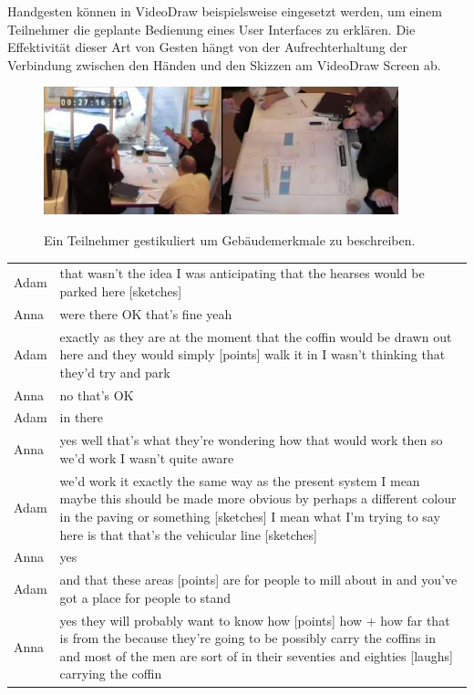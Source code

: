 \medskip Handgesten können in VideoDraw beispielsweise eingesetzt werden, um einem Teilnehmer die geplante Bedienung eines User Interfaces zu erklären. Die Effektivität dieser Art von Gesten hängt von der Aufrechterhaltung der Verbindung zwischen den Händen und den Skizzen am VideoDraw Screen ab.

\medskip
\begin{figure}[bth]
	{\includegraphics[width=\linewidth]{gfx/dantecGestures}}
	\caption[Beispiel von Gestik in einem Designmeeting. \citep{Dantec:2009}]{Ein Teilnehmer gestikuliert um Gebäudemerkmale zu beschreiben.}
	\label{fig:dantecGestures}
\end{figure}

\begin{extract}{
		\myfloatalign
		\begin{tabularx}{\textwidth}{p{1cm}X}
    		Adam & that wasn’t the idea I was anticipating that the hearses would be parked here [sketches] \\
			Anna & were there OK that’s fine yeah \\
			Adam & exactly as they are at the moment that the coffin would be drawn out	here and they would simply [points] walk it in I wasn’t thinking that they’d try and park \\
			Anna & no that’s OK \\
			Adam & in there \\
			Anna & yes well that’s what they’re wondering how that would work then so we’d work I wasn’t quite aware \\
			Adam & we’d work it exactly the same way as the present system I mean maybe this should be made more obvious by perhaps a different colour in the paving or something [sketches] I mean what I’m trying to say here is that that’s the vehicular line [sketches] \\
			Anna & yes \\
			Adam & and that these areas [points] are for people to mill about in and you’ve got a place for people to stand \\
			Anna & yes they will probably want to know how [points] how + how far that is from the because they’re going to be possibly carry the coffins in and most of the men are sort of in their seventies and eighties [laughs] carrying the coffin \\
		\end{tabularx}
	}
	\label{ext:dantecGestures}
\end{extract}

